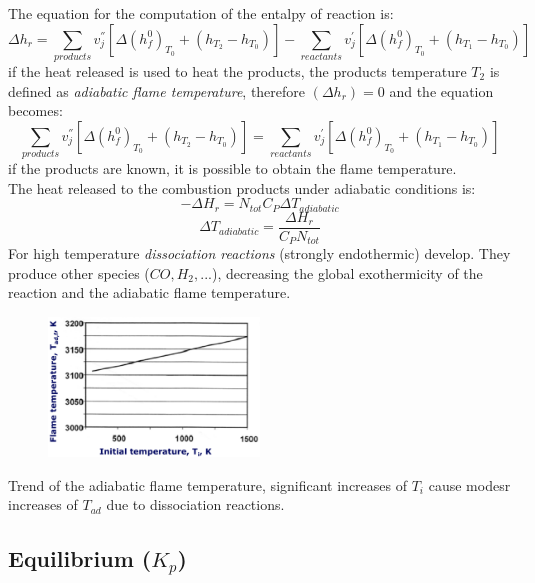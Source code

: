 \documentclass[12pt]{article}
\begin{document}
The equation for the computation of the entalpy of reaction is:
\begin{equation}
    \Delta h_{r}= \sum_{products} v_{j}^{''}[\Delta (h_{f}^{0})_{T_{0}}+(h_{T_{2}}-h_{T_{0}})] -\sum_{reactants} v_{j}^{'}[\Delta (h_{f}^{0})_{T_{0}}+(h_{T_{1}}-h_{T_{0}})]
\end{equation}
if the heat released is used to heat the products, the products temperature $T_{2}$ is defined as \textit{adiabatic flame temperature}, therefore $(\Delta h_{r})=0$ and the equation becomes:
\begin{equation}
    \sum_{products} v_{j}^{''}[\Delta (h_{f}^{0})_{T_{0}}+(h_{T_{2}}-h_{T_{0}})] =\sum_{reactants} v_{j}^{'}[\Delta (h_{f}^{0})_{T_{0}}+(h_{T_{1}}-h_{T_{0}})]
\end{equation}
if the products are known, it is possible to obtain the flame temperature.
\\
The heat released to the combustion products under adiabatic conditions is:
\begin{equation}
    -\Delta H_{r} = N_{tot}C_{P}\Delta T_{adiabatic}
\end{equation}
\begin{equation}
    \Delta T_{adiabatic} = \frac{\Delta H_{r}}{C_{P}N_{tot}}
\end{equation}
 For high temperature \textit{dissociation reactions} (strongly endothermic) develop. They produce other species ($CO, H_{2},...$), decreasing the global exothermicity of the reaction and the adiabatic flame temperature.
\begin{figure}[!ht]
\centering
\includegraphics[width=0.5\textwidth]{figures/dissociation.png}
\end{figure}
Trend of the adiabatic flame temperature, significant increases of $T_{i}$ cause modesr increases of $T_{ad}$ due to dissociation reactions.

\subsection{Equilibrium ($K_{p}$)}
\end{document}
